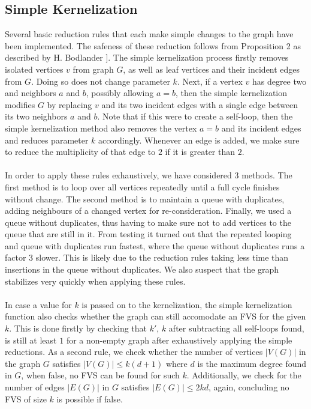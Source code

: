 \subsection{Simple Kernelization} %
Several basic reduction rules that each make simple changes to the graph have been implemented. The safeness of these reduction follows from Proposition 2 as described by H. Bodlander \cite{bodlander}]. The simple kernelization process firstly removes isolated vertices $v$ from graph $G$, as well as leaf vertices and their incident edges from $G$. Doing so does not change parameter $k$. Next, if a vertex $v$ has degree two and neighbors $a$ and $b$, possibly allowing $a=b$, then the simple kernelization modifies $G$ by replacing $v$ and its two incident edges with a single edge between its two neighbors $a$ and $b$. Note that if this were to create a self-loop, then the simple kernelization method also removes the vertex $a=b$ and its incident edges and reduces parameter $k$ accordingly. Whenever an edge is added, we make sure to reduce the multiplicity of that edge to $2$ if it is greater than $2$. \\\\
In order to apply these rules exhaustively, we have considered $3$ methods. The first method is to loop over all vertices repeatedly until a full cycle finishes without change. The second method is to maintain a queue with duplicates, adding neighbours of a changed vertex for re-consideration. Finally, we used a queue without duplicates, thus having to make sure not to add vertices to the queue that are still in it. From testing it turned out that the repeated looping and queue with duplicates run fastest, where the queue without duplicates runs a factor $3$ slower. This is likely due to the reduction rules taking less time than insertions in the queue without duplicates. We also suspect that the graph stabilizes very quickly when applying these rules.\\\\
In case a value for $k$ is passed on to the kernelization, the simple kernelization function also checks whether the graph can still accomodate an FVS for the given $k$. This is done firstly by checking that $k'$, $k$ after subtracting all self-loops found, is still at least $1$ for a non-empty graph after exhaustively applying the simple reductions. As a second rule, we check whether the number of vertices $|V(G)|$ in the graph $G$ satisfies $|V(G)|\leq k(d+1)$ where $d$ is the maximum degree found in $G$, when false, no FVS can be found for such $k$. Additionally, we check for the number of edges $|E(G)|$ in $G$ satisfies $|E(G)|\leq 2kd$, again, concluding no FVS of size $k$ is possible if false.
